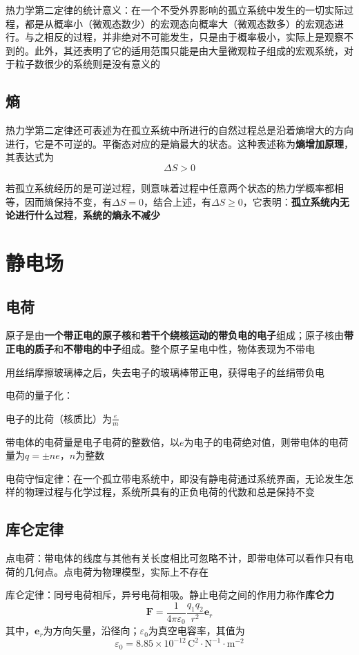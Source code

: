 \documentclass[12pt, a4paper, twoside]{ctexbook}
\begin{document}
{\sonti 热力学第二定律的统计意义}：在一个不受外界影响的孤立系统中发生的一切实际过程，都是从概率小（微观态数少）的宏观态向概率大（微观态数多）的宏观态进行。与之相反的过程，并非绝对不可能发生，只是由于概率极小，实际上是观察不到的。此外，其还表明了它的适用范围只能是由大量微观粒子组成的宏观系统，对于粒子数很少的系统则是没有意义的
\section{熵}
热力学第二定律还可表述为在孤立系统中所进行的自然过程总是沿着熵增大的方向进行，它是不可逆的。平衡态对应的是熵最大的状态。这种表述称为\textbf{熵增加原理}，其表达式为
$$
\Delta S>0
$$

若孤立系统经历的是可逆过程，则意味着过程中任意两个状态的热力学概率都相等，因而熵保持不变，有$\Delta S=0$，结合上述，有$\Delta S \geqslant 0$，它表明：\textbf{孤立系统内无论进行什么过程}，\textbf{系统的熵永不减少}
\chapter{静电场}
\newpage
\section{电荷}
原子是由\textbf{一个带正电的原子核}和\textbf{若干个绕核运动的带负电的电子}组成；原子核由\textbf{带正电的质子}和\textbf{不带电的中子}组成。整个原子呈电中性，物体表现为不带电

用丝绢摩擦玻璃棒之后，失去电子的玻璃棒带正电，获得电子的丝绢带负电

{\sonti 电荷的量子化}：

电子的比荷（核质比）为$\frac{e}{m}$

带电体的电荷量是电子电荷的整数倍，以$e$为电子的电荷绝对值，则带电体的电荷量为$q=\pm ne$，$n$为整数

{\sonti 电荷守恒定律}：在一个孤立带电系统中，即没有静电荷通过系统界面，无论发生怎样的物理过程与化学过程，系统所具有的正负电荷的代数和总是保持不变
\section{库仑定律}
{\sonti 点电荷}：带电体的线度与其他有关长度相比可忽略不计，即带电体可以看作只有电荷的几何点。点电荷为物理模型，实际上不存在

{\sonti 库仑定律}：同号电荷相斥，异号电荷相吸。静止电荷之间的作用力称作\textbf{库仑力}
$$
\boldsymbol{F}=\frac{1}{4\pi \varepsilon _0}\frac{q_1q_2}{r^2}\boldsymbol{e}_r
$$
其中，$\boldsymbol{e}_r$为方向矢量，沿径向；$\varepsilon _0$为真空电容率，其值为
$$
\varepsilon _0=8.85\times 10^{-12}\,\mathrm{C}^2\cdot\mathrm{N}^{-1}\cdot\mathrm{m}^{-2}
$$
\end{document}

